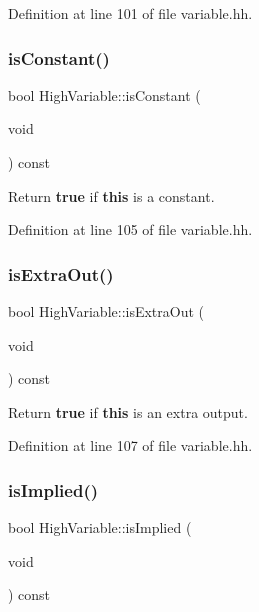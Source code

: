 Definition at line 101 of file variable.\+hh.

\mbox{\label{class_high_variable_ad98daa755444e757ae938fc735cbf73d}} 
\subsubsection{\texorpdfstring{isConstant()}{isConstant()}}
{\footnotesize\ttfamily bool High\+Variable\+::is\+Constant (\begin{DoxyParamCaption}\item[{void}]{ }\end{DoxyParamCaption}) const\hspace{0.3cm}{\ttfamily [inline]}}



Return {\bfseries{true}} if {\bfseries{this}} is a constant. 



Definition at line 105 of file variable.\+hh.

\mbox{\label{class_high_variable_a35417f6a1f6c8f4b4d54d13f859fdc66}} 
\subsubsection{\texorpdfstring{isExtraOut()}{isExtraOut()}}
{\footnotesize\ttfamily bool High\+Variable\+::is\+Extra\+Out (\begin{DoxyParamCaption}\item[{void}]{ }\end{DoxyParamCaption}) const\hspace{0.3cm}{\ttfamily [inline]}}



Return {\bfseries{true}} if {\bfseries{this}} is an extra output. 



Definition at line 107 of file variable.\+hh.

\mbox{\label{class_high_variable_a0a5807c7fb340913980697f56a495011}} 
\subsubsection{\texorpdfstring{isImplied()}{isImplied()}}
{\footnotesize\ttfamily bool High\+Variable\+::is\+Implied (\begin{DoxyParamCaption}\item[{void}]{ }\end{DoxyParamCaption}) const\hspace{0.3cm}{\ttfamily [inline]}}



